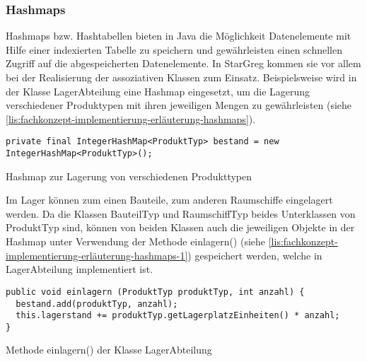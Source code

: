 \subsubsection{Hashmaps}
\label{subsub:fachkonzept-implementierung-erläuterung-hashmaps}

Hashmaps bzw. Hashtabellen bieten in Java die Möglichkeit Datenelemente mit Hilfe einer indexierten Tabelle zu speichern und gewährleisten einen schnellen Zugriff auf die abgespeicherten Datenelemente. In StarGreg kommen sie vor allem bei der Realisierung der assoziativen Klassen zum Einsatz. Beispielsweise wird in der Klasse LagerAbteilung eine Hashmap eingesetzt, um die Lagerung verschiedener Produktypen mit ihren jeweiligen Mengen zu gewährleisten (siehe \ref{lis:fachkonzept-implementierung-erläuterung-hashmaps}).

\begin{programm}[htbp]
\begin{lstlisting}[breaklines=true]
private final IntegerHashMap<ProduktTyp> bestand = new IntegerHashMap<ProduktTyp>();
\end{lstlisting}
\caption{Hashmap zur Lagerung von verschiedenen Produkttypen\label{lis:fachkonzept-implementierung-erläuterung-hashmaps}}
\end{programm}

Im Lager können zum einen Bauteile, zum anderen Raumschiffe eingelagert werden. Da die Klassen BauteilTyp und RaumschiffTyp beides Unterklassen von ProduktTyp sind, können von beiden Klassen auch die jeweiligen Objekte in der Hashmap unter Verwendung der Methode einlagern() (siehe \ref{lis:fachkonzept-implementierung-erläuterung-hashmaps-1}) gespeichert werden, welche in LagerAbteilung implementiert ist.

\begin{programm}[htbp]
\begin{lstlisting}[breaklines=true]
public void einlagern (ProduktTyp produktTyp, int anzahl) {
  bestand.add(produktTyp, anzahl);
  this.lagerstand += produktTyp.getLagerplatzEinheiten() * anzahl;
}
\end{lstlisting}
\caption{Methode einlagern() der Klasse LagerAbteilung\label{lis:fachkonzept-implementierung-erläuterung-hashmaps-1}}
\end{programm}